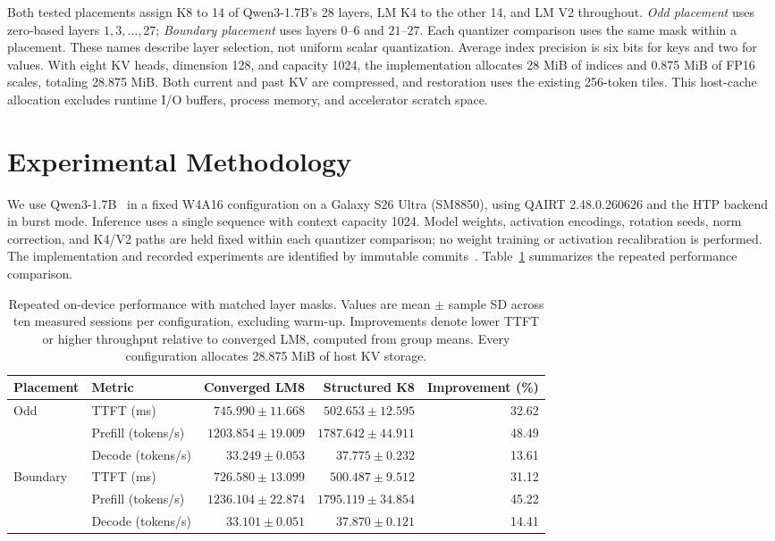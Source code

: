 \documentclass[conference,a4paper,10pt]{IEEEtran}
\begin{document}
Both tested placements assign K8 to 14 of Qwen3-1.7B's 28 layers, LM K4 to the other 14, and LM V2 throughout. \emph{Odd placement} uses zero-based layers $1,3,\ldots,27$; \emph{Boundary placement} uses layers $0$--$6$ and $21$--$27$. Each quantizer comparison uses the same mask within a placement. These names describe layer selection, not uniform scalar quantization. Average index precision is six bits for keys and two for values. With eight KV heads, dimension 128, and capacity 1024, the implementation allocates 28 MiB of indices and 0.875 MiB of FP16 scales, totaling 28.875 MiB. Both current and past KV are compressed, and restoration uses the existing 256-token tiles. This host-cache allocation excludes runtime I/O buffers, process memory, and accelerator scratch space.

\section{Experimental Methodology}
We use Qwen3-1.7B~\cite{qwen3} in a fixed W4A16 configuration on a Galaxy S26 Ultra (SM8850), using QAIRT 2.48.0.260626 and the HTP backend in burst mode. Inference uses a single sequence with context capacity 1024. Model weights, activation encodings, rotation seeds, norm correction, and K4/V2 paths are held fixed within each quantizer comparison; no weight training or activation recalibration is performed. The implementation and recorded experiments are identified by immutable commits~\cite{artifact}. Table~\ref{tab:lm-repeated} summarizes the repeated performance comparison.

\begin{table}[t]
\caption{Repeated on-device performance with matched layer masks. Values are mean $\pm$ sample SD across ten measured sessions per configuration, excluding warm-up. Improvements denote lower TTFT or higher throughput relative to converged LM8, computed from group means. Every configuration allocates 28.875 MiB of host KV storage.}
\label{tab:lm-repeated}
\centering
\setlength{\tabcolsep}{8pt}
\begin{tabular}{@{}llrrr@{}}
\toprule
Placement & Metric & Converged LM8 & Structured K8 & Improvement (\%)\\
\midrule
Odd & TTFT (ms) & $745.990\pm11.668$ & $502.653\pm12.595$ & 32.62\\
 & Prefill (tokens/s) & $1203.854\pm19.009$ & $1787.642\pm44.911$ & 48.49\\
 & Decode (tokens/s) & $33.249\pm0.053$ & $37.775\pm0.232$ & 13.61\\
\midrule
Boundary & TTFT (ms) & $726.580\pm13.099$ & $500.487\pm9.512$ & 31.12\\
 & Prefill (tokens/s) & $1236.104\pm22.874$ & $1795.119\pm34.854$ & 45.22\\
 & Decode (tokens/s) & $33.101\pm0.051$ & $37.870\pm0.121$ & 14.41\\
\bottomrule
\end{tabular}
\end{table}
\end{document}
